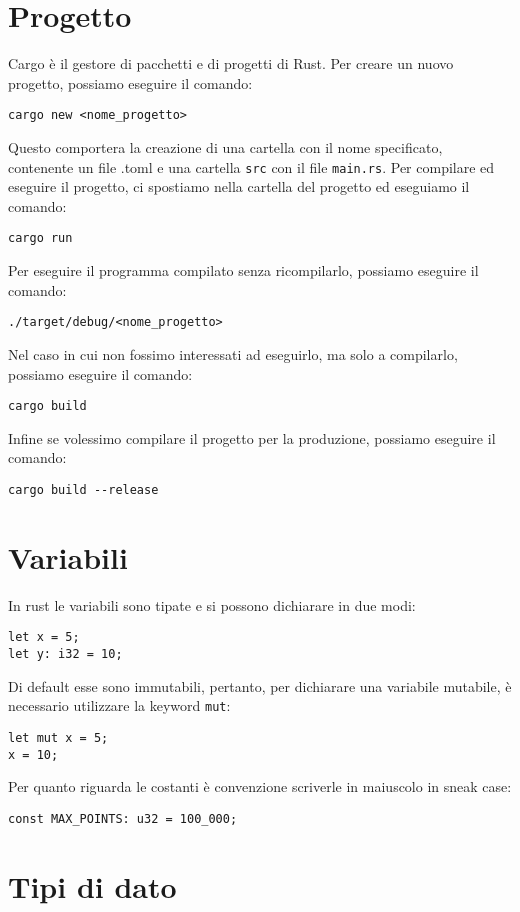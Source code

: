\documentclass[12pt]{article}
\begin{document}
\section{Progetto}
Cargo è il gestore di pacchetti e di progetti di Rust. 
Per creare un nuovo progetto, possiamo eseguire il comando:
\begin{verbatim}
cargo new <nome_progetto>
\end{verbatim}
Questo comportera la creazione di una cartella con il nome specificato,
contenente un file .toml e una cartella \texttt{src} con il file \texttt{main.rs}.
Per compilare ed eseguire il progetto, ci spostiamo nella cartella del progetto
ed eseguiamo il comando:
\begin{verbatim}
cargo run
\end{verbatim}
Per eseguire il programma compilato senza ricompilarlo, possiamo eseguire il comando:
\begin{verbatim}
./target/debug/<nome_progetto>
\end{verbatim}
Nel caso in cui non fossimo interessati ad eseguirlo, ma solo a compilarlo,
possiamo eseguire il comando:
\begin{verbatim}
cargo build
\end{verbatim}
Infine se volessimo compilare il progetto per la produzione, possiamo eseguire il comando:
\begin{verbatim}
cargo build --release
\end{verbatim}

\pagebreak
\section{Variabili}
In rust le variabili sono tipate e si possono dichiarare in due modi:
\begin{verbatim}
let x = 5;
let y: i32 = 10;
\end{verbatim}
Di default esse sono immutabili, pertanto, per dichiarare una 
variabile mutabile, è necessario utilizzare la keyword \texttt{mut}:
\begin{verbatim}
let mut x = 5;
x = 10;
\end{verbatim}
Per quanto riguarda le costanti è convenzione scriverle in maiuscolo
in sneak case:
\begin{verbatim}
const MAX_POINTS: u32 = 100_000;
\end{verbatim}

\section{Tipi di dato}
\end{document}
